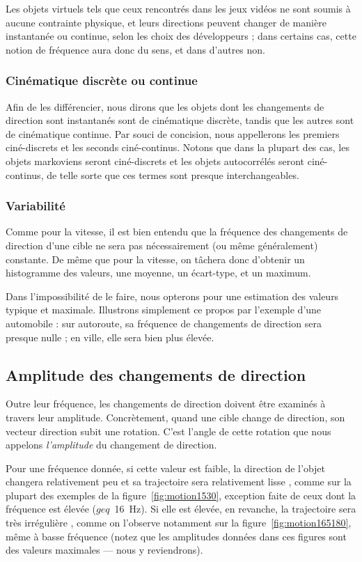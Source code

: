     Les objets virtuels tels que ceux rencontrés dans les jeux vidéos ne sont soumis à aucune contrainte physique, et leurs directions peuvent changer de manière instantanée ou continue, selon les choix des développeurs ; dans certains cas, cette notion de fréquence aura donc du sens, et dans d'autres non.
    
    \subsubsection{Cinématique discrète ou continue}
    Afin de les différencier, nous dirons que les objets dont les changements de direction sont instantanés sont de cinématique discrète, tandis que les autres sont de cinématique continue. Par souci de concision, nous appellerons les premiers ciné-discrets et les seconds ciné-continus. Notons que dans la plupart des cas, les objets markoviens seront ciné-discrets et les objets autocorrélés seront ciné-continus, de telle sorte que ces termes sont presque interchangeables.
    
    \subsubsection{Variabilité}
    Comme pour la vitesse, il est bien entendu que la fréquence des changements de direction d'une cible ne sera pas nécessairement (ou même généralement) constante. De même que pour la vitesse, on tâchera donc d'obtenir un histogramme des valeurs, une moyenne, un écart-type, et un maximum.
    
    Dans l'impossibilité de le faire, nous opterons pour une estimation des valeurs \og typique \fg{} et maximale. Illustrons simplement ce propos par l'exemple d'une automobile : sur autoroute, sa fréquence de changements de direction sera presque nulle ; en ville, elle sera bien plus élevée.
    
	\subsection{Amplitude des changements de direction}
	Outre leur fréquence, les changements de direction doivent être examinés à travers leur amplitude. Concrètement, quand une cible change de direction, son vecteur direction subit une rotation. C'est l'angle de cette rotation que nous appelons \emph{l'amplitude} du changement de direction.
	
	Pour une fréquence donnée, si cette valeur est faible, la direction de l'objet changera relativement peu et sa trajectoire sera relativement \og lisse \fg{}, comme sur la plupart des exemples de la figure~\ref{fig:motion1530}, exception faite de ceux dont la fréquence est élevée ($geq$~16~Hz). Si elle est élevée, en revanche, la trajectoire sera très \og irrégulière \fg{}, comme on l'observe notamment sur la figure~\ref{fig:motion165180}, même à basse fréquence (notez que les amplitudes données dans ces figures sont des valeurs maximales --- nous y reviendrons).
	
